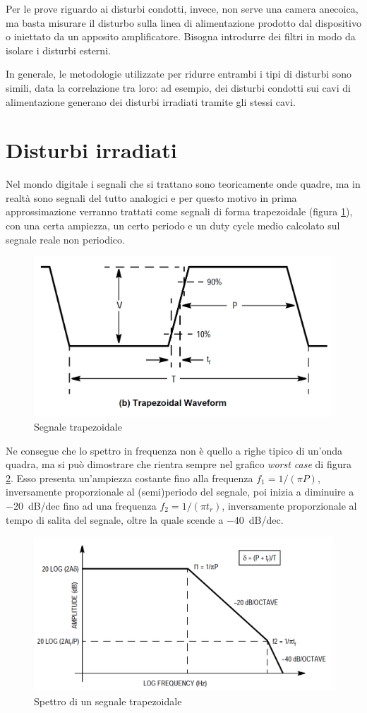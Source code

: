 \documentclass[11pt,4paper]{report}
\begin{document}
Per le prove riguardo ai disturbi condotti, invece, non serve una camera anecoica, ma basta misurare il disturbo sulla linea di alimentazione prodotto dal dispositivo o iniettato da un apposito amplificatore. Bisogna introdurre dei filtri in modo da isolare i disturbi esterni.

In generale, le metodologie utilizzate per ridurre entrambi i tipi di disturbi sono simili, data la correlazione tra loro: ad esempio, dei disturbi condotti sui cavi di alimentazione generano dei disturbi irradiati tramite gli stessi cavi.

\section{Disturbi irradiati}
Nel mondo digitale i segnali che si trattano sono teoricamente onde quadre, ma in realtà sono segnali del tutto analogici e per questo motivo in prima approssimazione verranno trattati come segnali di forma trapezoidale (figura \ref{fig:trapezio}), con una certa ampiezza, un certo periodo e un duty cycle medio calcolato sul segnale reale non periodico.

\begin{figure}[hbtp]
	\centering
	\includegraphics[width=0.6\linewidth]{emc/trapezio}
	\caption{Segnale trapezoidale}
	\label{fig:trapezio}
\end{figure}

Ne consegue che lo spettro in frequenza non è quello a righe tipico di un'onda quadra, ma si può dimostrare che rientra sempre nel grafico \emph{worst case} di figura \ref{fig:spettro_trapezio}. Esso presenta un'ampiezza costante fino alla frequenza $f_1 = 1/(\pi P)$, inversamente proporzionale al (semi)periodo del segnale, poi inizia a diminuire a \SI{-20}{dB/dec} fino ad una frequenza $f_2=1/(\pi t_r)$, inversamente proporzionale al tempo di salita del segnale, oltre la quale scende a \SI{-40}{dB/dec}.

\begin{figure}[hbtp]
	\centering
	\includegraphics[width=0.6\linewidth]{emc/spettro_trapezio}
	\caption{Spettro di un segnale trapezoidale}
	\label{fig:spettro_trapezio}
\end{figure}
\end{document}
